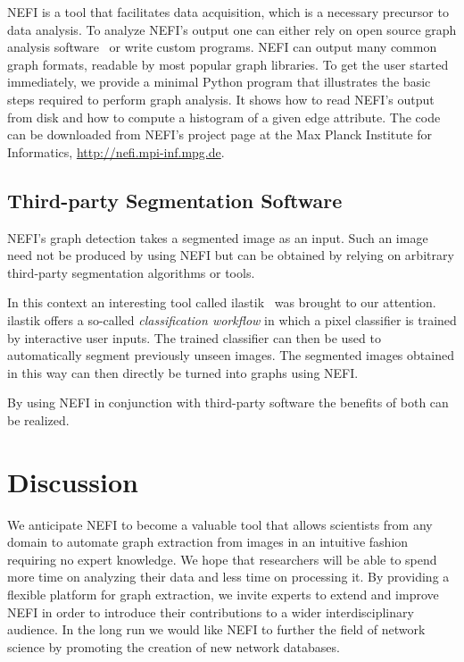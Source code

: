 		NEFI is a tool that facilitates data acquisition, which is a necessary precursor to data analysis. To analyze NEFI's output one can either rely on open source graph analysis software~\cite{ICWSM09154,snap,batagelj1998pajek,5437689,loscalzo2008social,hagberg2008exploring} or write custom programs. NEFI can output many common graph formats, readable by most popular graph libraries. To get the user started immediately, we provide a minimal Python program that illustrates the basic steps required to perform graph analysis. It shows how to read NEFI's output from disk and how to compute a histogram of a given edge attribute. The code can be downloaded from NEFI's project page at the Max Planck Institute for Informatics, \href{http://nefi.mpi-inf.mpg.de}{http://nefi.mpi-inf.mpg.de}.

	\subsection{Third-party Segmentation Software}

		NEFI's graph detection takes a segmented image as an input. Such an image need not be produced by using NEFI but can be obtained by relying on arbitrary third-party segmentation algorithms or tools. 

		In this context an interesting tool called ilastik~\cite{sommer2011ilastik} was brought to our attention. ilastik offers a so-called \emph{classification workflow} in which a pixel classifier is trained by interactive user inputs. The trained classifier can then be used to automatically segment previously unseen images. The segmented images obtained in this way can then directly be turned into graphs using NEFI. 

		By using NEFI in conjunction with third-party software the benefits of both can be realized.

\section{Discussion}

	We anticipate NEFI to become a valuable tool that allows scientists from any domain to automate graph extraction from images in an intuitive fashion requiring no expert knowledge. We hope that researchers will be able to spend more time on analyzing their data and less time on processing it. By providing a flexible platform for graph extraction, we invite experts to extend and improve NEFI in order to introduce their contributions to a wider interdisciplinary audience. In the long run we would like NEFI to further the field of network science by promoting the creation of new network databases.

